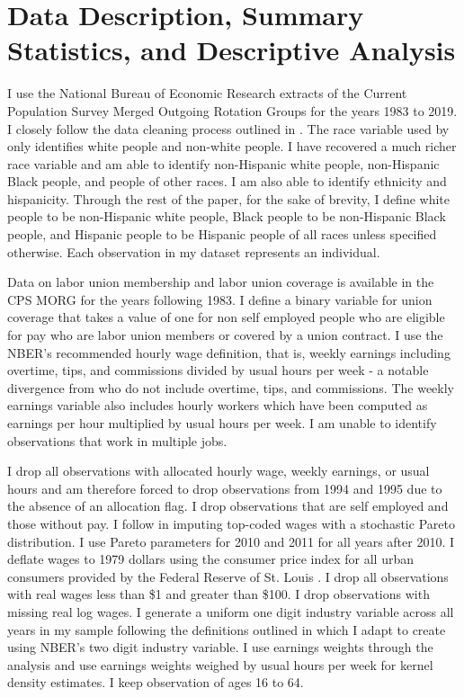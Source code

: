 \documentclass[11pt]{article}
\begin{document}
\section{Data Description, Summary Statistics, and Descriptive Analysis}\label{sec:data}
I use the National Bureau of Economic Research extracts of the Current Population Survey Merged Outgoing Rotation Groups for the years 1983 to 2019. I closely follow the data cleaning process outlined in \citet{fll2021}. The race variable used by \citet{fll2021} only identifies white people and non-white people. I have recovered a much richer race variable and am able to identify non-Hispanic white people, non-Hispanic Black people, and people of other races. I am also able to identify ethnicity and hispanicity. Through the rest of the paper, for the sake of brevity, I define white people to be non-Hispanic white people, Black people to be non-Hispanic Black people, and Hispanic people to be Hispanic people of all races unless specified otherwise. Each observation in my dataset represents an individual.

Data on labor union membership and labor union coverage is available in the CPS MORG for the years following 1983. I define a binary variable for union coverage that takes a value of one for non self employed people who are eligible for pay who are labor union members or covered by a union contract. I use the NBER's recommended hourly wage definition, that is, weekly earnings including overtime, tips, and commissions divided by usual hours per week - a notable divergence from \citet{fll2021} who do not include overtime, tips, and commissions. The weekly earnings variable also includes hourly workers which have been computed as earnings per hour multiplied by usual hours per week. I am unable to identify observations that work in multiple jobs. 

I drop all observations with allocated hourly wage, weekly earnings, or usual hours and am therefore forced to drop observations from 1994 and 1995 due to the absence of an allocation flag. I drop observations that are self employed and those without pay. I follow \citet{fll2021} in imputing top-coded wages with a stochastic Pareto distribution. I use Pareto parameters for 2010 and 2011 for all years after 2010. I deflate wages to 1979 dollars using the consumer price index for all urban consumers provided by the Federal Reserve of St. Louis \citep{cpiaucsl}. I drop all observations with real wages less than \$1 and greater than \$100. I drop observations with missing real log wages. I generate a uniform one digit industry variable across all years in my sample following the definitions outlined in \citet{fll2021} which I adapt to create using NBER's two digit industry variable. I use earnings weights through the analysis and use earnings weights weighed by usual hours per week for kernel density estimates. I keep observation of ages 16 to 64.
\end{document}
